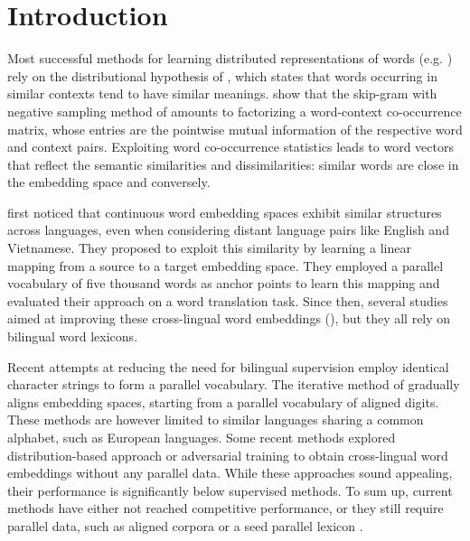 \documentclass{article} \usepackage{iclr2018_conference,times}
\begin{document}
 \section{Introduction}
\label{sec_introduction}

Most successful methods for learning distributed representations of words (e.g.  \cite{mikolov2013distributed, mikolov2013efficient, pennington2014glove, bojanowski2016enriching}) rely on the distributional hypothesis of \cite{harris1954distributional}, which states that words occurring in similar contexts tend to have similar meanings. \cite{levy2014neural} show that the skip-gram with negative sampling method of \cite{mikolov2013distributed} amounts to factorizing a word-context co-occurrence matrix, whose entries are the pointwise mutual information of the respective word and context pairs. Exploiting word co-occurrence statistics leads to word vectors that reflect the semantic similarities and dissimilarities: similar words are close in the embedding space and conversely.

\cite{mikolov2013exploiting} first noticed that continuous word embedding spaces exhibit similar structures across languages, even when considering distant language pairs like English and Vietnamese. They proposed to exploit this similarity by learning a linear mapping from a source to a target embedding space. They employed a parallel vocabulary of five thousand words as anchor points to learn this mapping and evaluated their approach on a word translation task. Since then, several studies aimed at improving these cross-lingual word embeddings (\cite{faruqui2014improving,  xing2015normalized, marcobaroni2015hubness, ammar2016massively, artetxe2016learning, smith2017offline}), but they all rely on bilingual word lexicons.

Recent attempts at reducing the need for bilingual supervision \citep{smith2017offline} employ identical character strings to form a parallel vocabulary. The iterative method of \citet{artetxe} gradually aligns embedding spaces, starting from a parallel vocabulary of aligned digits. These methods are however limited to similar languages sharing a common alphabet, such as European languages. Some recent methods explored distribution-based approach \citep{cao2016distribution} or adversarial training \cite{zhangadversarial} to obtain cross-lingual word embeddings without any parallel data. While these approaches sound appealing, their performance is significantly below supervised methods. To sum up, current methods have either not reached competitive performance, or they still require parallel data, such as aligned corpora \citep{gouws2015bilbowa, vulic2015bilingual} or a seed parallel lexicon \citep{duong2016learning}.
\end{document}
